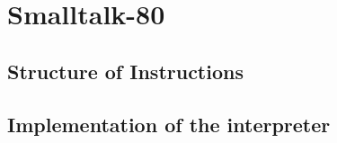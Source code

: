 \chapter{Smalltalk-80}

\section{Structure of Instructions}

\section{Implementation of the interpreter}
